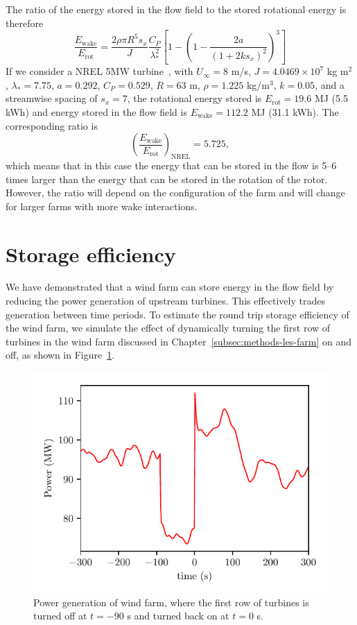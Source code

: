 The ratio of the energy stored in the flow field to the stored rotational energy is therefore
\begin{equation}
\frac{E_\text{wake}}{E_\text{rot}} = \frac{2 \rho \pi R^5s _x}{J} \frac{C_P}{\lambda_*^2} \left[ 1 - \left(1 - \frac{2 a}{(1 + 2ks_x)^2}\right)^3\right]
\end{equation}
If we consider a NREL 5MW turbine~\cite{Jonkman2009a}, with $U_\infty = 8$ m/s, $J = 4.0469\times 10^7$ kg m$^2$, $\lambda_* = 7.75$, $a = 0.292$, $C_P = 0.529$, $R = 63$ m, $\rho = 1.225$ kg/m$^3$, $k = 0.05$, and a streamwise spacing of $s_x = 7$, the rotational energy stored is $E_\text{rot} = 19.6$ MJ (5.5 kWh) and energy stored in the flow field is $E_\text{wake} = 112.2$ MJ (31.1 kWh). The corresponding ratio is
\begin{equation}
\left(\frac{E_\text{wake}}{E_\text{rot}}\right)_\text{NREL} = 5.725,
\end{equation}
which means that in this case the energy that can be stored in the flow is 5--6 times larger than the energy that can be stored in the rotation of the rotor. However, the ratio will depend on the configuration of the farm and will change for larger farms with more wake interactions.

\section*{Storage efficiency}
We have demonstrated that a wind farm can store energy in the flow field by reducing the power generation of upstream turbines. This effectively trades generation between time periods. To estimate the round trip storage efficiency of the wind farm, we simulate the effect of dynamically turning the first row of turbines in the wind farm discussed in Chapter~\ref{subsec:methods-les-farm} on and off, as shown in Figure~\ref{fig:app-dyn}.

\begin{figure}[h!]
\centering
\includegraphics{./fig/fr.pdf}
\caption{Power generation of wind farm, where the first row of turbines is turned off at $t= -90$ s and turned back on at $t=0$ s. }
\label{fig:app-dyn}
\end{figure}

